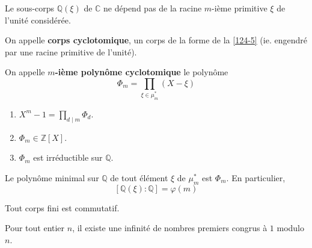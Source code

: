	\begin{proposition}
		\label{125-4}
		Le sous-corps $\mathbb{Q}(\xi)$ de $\mathbb{C}$ ne dépend pas de la racine $m$-ième primitive $\xi$ de l'unité considérée.
	\end{proposition}

	\begin{definition}
		On appelle \textbf{corps cyclotomique}, un corps de la forme de la \cref{124-5} (ie. engendré par une racine primitive de l'unité).
	\end{definition}

	\begin{definition}
		On appelle \textbf{$m$-ième polynôme cyclotomique} le polynôme
		\[ \Phi_m = \prod_{\xi \in \mu_m^*} (X - \xi) \]
	\end{definition}

	\begin{theorem}
		\begin{enumerate}
			\item $X^m - 1 = \prod_{d \mid m} \Phi_d$.
			\item $\Phi_m \in \mathbb{Z}[X]$.
			\item $\Phi_m$ est irréductible sur $\mathbb{Q}$.
		\end{enumerate}
	\end{theorem}

	\begin{corollary}
		Le polynôme minimal sur $\mathbb{Q}$ de tout élément $\xi$ de $\mu_m^*$ est $\Phi_m$. En particulier,
		\[ [\mathbb{Q}(\xi):\mathbb{Q}]=\varphi(m) \]
	\end{corollary}

	\begin{application}
		Tout corps fini est commutatif.
	\end{application}


	\begin{application}
		Pour tout entier $n$, il existe une infinité de nombres premiers congrus à $1$ modulo $n$.
	\end{application}

